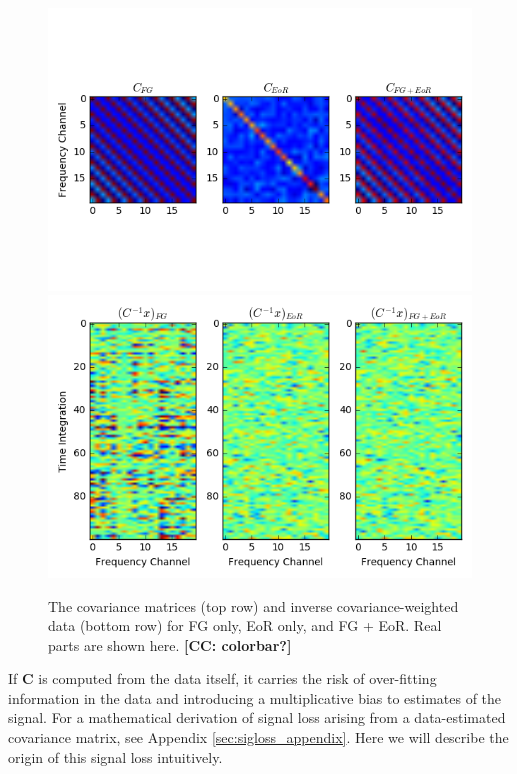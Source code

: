 \documentclass[preprint2,numberedappendix,tighten]{aastex6}  %
\newcommand{\cc}[1]{{\color{purple} \textbf{[CC: #1]}}}
\begin{document}
\begin{figure}
	\centering
	\includegraphics[trim={0.3cm 2.3cm 0.3cm 2.3cm},clip,width=\columnwidth]{plots/toy_sigloss12.png}
	\includegraphics[trim={0.3cm 0.2cm 0.3cm 0.3cm},clip,width=\columnwidth]{plots/toy_sigloss13.png}
	\caption{The covariance matrices (top row) and inverse covariance-weighted data (bottom row) for FG only, EoR only, and FG + EoR. Real parts are shown here. \cc{colorbar?}}
	\label{fig:toy_sigloss12}
\end{figure}

If $\textbf{C}$ is computed from the data itself, it carries the risk of over-fitting information in the data and introducing a multiplicative bias to estimates of the signal. For a mathematical derivation of signal loss arising from a data-estimated covariance matrix, see Appendix \ref{sec:sigloss_appendix}. Here we will describe the origin of this signal loss intuitively.
\end{document}
